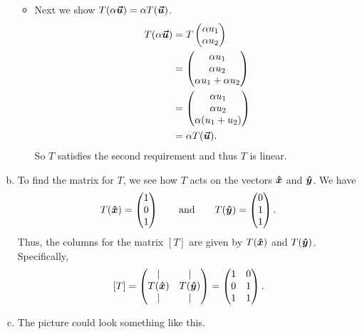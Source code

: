 \documentclass[12pt]{article} %
\begin{document}
\begin{solution}
\begin{enumerate}[(a)]
\begin{itemize}
        \item Next we show $T(\alpha \vecu)=\alpha T(\vecu)$.
        \begin{align*}
            T(\alpha \vecu) &= T \begin{pmatrix} \alpha u_1 \\ \alpha u_2 \end{pmatrix}\\
            &= \begin{pmatrix} \alpha u_1 \\ \alpha u_2 \\ \alpha u_1 + \alpha u_2 \end{pmatrix} \\
            &= \begin{pmatrix} \alpha u_1 \\ \alpha u_2 \\ \alpha (u_1 +  u_2) \end{pmatrix}\\
            &= \alpha T(\vecu).
        \end{align*}
        So $T$ satisfies the second requirement and thus $T$ is linear.
        \end{itemize}
        \item To find the matrix for $T$, we see how $T$ acts on the vectors $\xhat$ and $\yhat$. We have
        \[
            T(\xhat) = \begin{pmatrix} 1 \\ 0 \\ 1 \end{pmatrix} \qquad \textrm{and} \qquad T(\yhat) = \begin{pmatrix} 0 \\ 1 \\ 1 \end{pmatrix}.
        \]
        Thus, the columns for the matrix $[T]$ are given by $T(\xhat)$ and $T(\yhat)$.  Specifically,
        \[
            [T] = \begin{pmatrix} \vert & \vert \\ T(\xhat) & T(\yhat) \\ \vert & \vert \end{pmatrix} = \begin{pmatrix} 1 & 0 \\ 0 & 1 \\ 1 & 1 \end{pmatrix}.
        \]
        \item The picture could look something like this.
        \begin{center}
\begin{tikzpicture} [scale=3, tdplot_main_coords, axis/.style={->,black,thick}, 
vector/.style={-stealth,blue,very thick}, 
vector guide/.style={dashed,red,thick}]


\end{tikzpicture}
\end{center}
\end{enumerate}
\end{solution}
\end{document}

